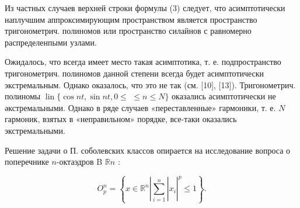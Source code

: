 \documentclass[10pt]{article}
\begin{document}
Из частных случаев верхней строки формулы (3) следует, что асимптотически наплучшим аппроксимирующим пространством является пространство тригонометрич. полиномов или пространство силайнов с равномерно распределенпыми узлами.



Ожидалось, что всегда имеет место такая асимптотика, т. е. подпространство тригонометрич. полиномов данной степени всегда будет асимптотически экстремальным. Однако оказалось, что это не так (см. [10], [13]). Тригонометрич. полиномы $\operatorname{lin}\{\cos n t, \sin n t, 0 \leqslant$ $\leqslant n \leqslant N\}$ оказались асимптотически не әкстремальными. Однако в ряде случаев «переставленные» гармоники, т. е. $N$ гармоник, взятых в «неправильном» порядке, все-таки оказались экстремальными.



Решение задачи о П. соболевских классов опирается на исследование вопроса о поперечнике $n$-октаэдров B $\mathbb{R} n$ :



\[

O_{p}^{n}=\left\{\left.x \in \mathbb{R}^{n}\left|\sum_{i=1}^{n}\right| x_{i}\right|^{p} \leqslant 1\right\} .

\]
\end{document}

